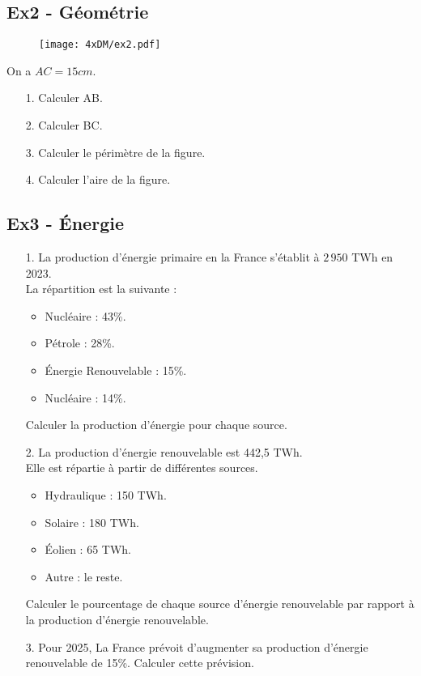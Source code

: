 \begin{multicols}{2}\noindent

\subsection*{Ex2 - Géométrie}

\begin{figure}[H]
  \centering
  \texttt{[image: 4xDM/ex2.pdf]}
\end{figure}

On a $AC = 15cm$.

\begin{enumerate}
  \item[1.] Calculer AB.
  \item[2.] Calculer BC.
  \item[3.] Calculer le périmètre de la figure.
  \item[4.] Calculer l'aire de la figure. 
\end{enumerate} \columnbreak

\subsection*{Ex3 - Énergie}

\begin{enumerate}
  \item[1.] La production d’énergie primaire en la France s’établit à $2 \, 950$ TWh en 2023. \\
  La répartition est la suivante : 

  \begin{itemize}[label={$\bullet$}]
    \item Nucléaire : 43\%. 
    \item Pétrole : 28\%. 
    \item Énergie Renouvelable : 15\%. 
    \item Nucléaire : 14\%.
  \end{itemize} 
  Calculer la production d'énergie pour chaque source. 

  \item[2.] La production d'énergie renouvelable est 442,5 TWh. \\
  Elle est répartie à partir de différentes sources.

  \begin{itemize}[label={$\bullet$}]
    \item Hydraulique : 150 TWh. 
    \item Solaire : 180 TWh. 
    \item Éolien : 65 TWh.
    \item Autre : le reste. 
  \end{itemize} 

  Calculer le pourcentage de chaque source d'énergie renouvelable par rapport à la production d'énergie renouvelable.

  \item[3.] Pour 2025, La France prévoit d'augmenter sa production d'énergie renouvelable de 15\%. Calculer cette prévision. 
\end{enumerate}

\end{multicols}

